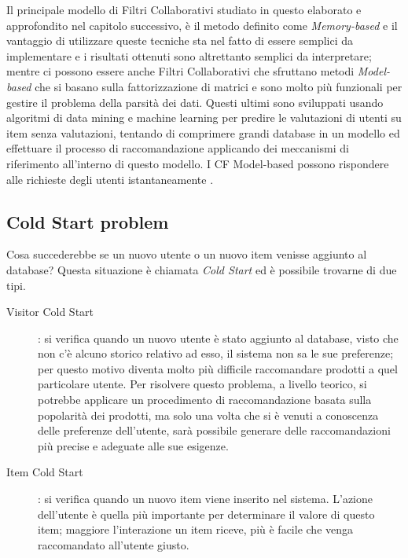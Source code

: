 Il principale modello di Filtri Collaborativi studiato in questo elaborato e approfondito nel capitolo successivo, è il metodo definito 
come \textit{Memory-based} e il  vantaggio di utilizzare queste tecniche sta nel fatto di essere semplici da implementare e i risultati 
ottenuti sono altrettanto semplici da interpretare; mentre ci possono essere anche Filtri Collaborativi che sfruttano metodi 
\textit{Model-based} che si basano sulla fattorizzazione di matrici e sono molto più funzionali per gestire il problema della 
parsità dei dati. Questi ultimi sono sviluppati usando algoritmi di data mining e machine learning per predire le valutazioni di utenti 
su item senza valutazioni, tentando di comprimere grandi database in un modello ed effettuare il processo di raccomandazione applicando dei
meccanismi di riferimento all'interno di questo modello. 
I CF Model-based possono rispondere alle richieste degli utenti istantaneamente \cite{model-based-approach-for-collaborative-filtering}.


\subsection{Cold Start problem} 
Cosa succederebbe se un nuovo utente o un nuovo item venisse aggiunto al database? Questa situazione è chiamata \textit{Cold Start} ed
è possibile trovarne di due tipi.
\begin{description}
	\item[Visitor Cold Start]: si verifica quando un nuovo utente è stato aggiunto al database, visto che non c'è alcuno storico relativo ad esso, il sistema non
	sa le sue preferenze; per questo motivo diventa molto più difficile raccomandare prodotti a quel particolare utente. Per risolvere questo problema,
	a livello teorico, si potrebbe applicare un procedimento di raccomandazione basata sulla popolarità dei prodotti, ma solo una volta che si è venuti a 
	conoscenza delle preferenze dell'utente, sarà possibile generare delle raccomandazioni più precise e adeguate alle sue esigenze.
	\item[Item Cold Start]: si verifica quando un nuovo item viene inserito nel sistema. L'azione dell'utente è quella più importante per determinare
	il valore di questo item; maggiore l'interazione un item riceve, più è facile che venga raccomandato all'utente giusto.  
\end{description}



